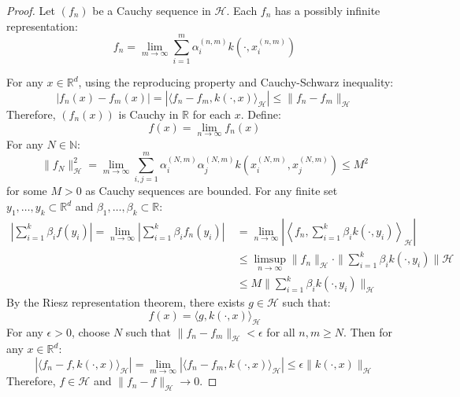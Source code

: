 \begin{proof}    

Let $(f_n)$ be a Cauchy sequence in $\mathcal{H}$. Each $f_n$ has a possibly infinite representation:
$$f_n = \lim_{m \to \infty} \sum_{i=1}^m \alpha_i^{(n,m)} k(\cdot,x_i^{(n,m)})$$

For any $x \in \mathbb{R}^d$, using the reproducing property and Cauchy-Schwarz inequality:
$$|f_n(x) - f_m(x)| = |\langle f_n - f_m, k(\cdot,x)\rangle_\mathcal{H}| \leq \|f_n - f_m\|_\mathcal{H}$$
Therefore, $(f_n(x))$ is Cauchy in $\mathbb{R}$ for each $x$. Define:
$$f(x) = \lim_{n \to \infty} f_n(x)$$
For any $N \in \mathbb{N}$:
$$\|f_N\|_\mathcal{H}^2 = \lim_{m \to \infty} \sum_{i,j=1}^m \alpha_i^{(N,m)} \alpha_j^{(N,m)} k(x_i^{(N,m)},x_j^{(N,m)}) \leq M^2$$
for some $M > 0$ as Cauchy sequences are bounded.
For any finite set ${y_1,\ldots,y_k} \subset \mathbb{R}^d$ and ${\beta_1,\ldots,\beta_k} \subset \mathbb{R}$:
\begin{align*}
\left|\sum_{i=1}^k \beta_i f(y_i)\right| = \lim_{n \to \infty} \left|\sum_{i=1}^k \beta_i f_n(y_i)\right| \
&= \lim_{n \to \infty} \left|\left\langle f_n, \sum_{i=1}^k \beta_i k(\cdot,y_i)\right\rangle_{\mathcal{H}}\right| \\
&\leq \limsup_{n \to \infty} \|f_n\|_{\mathcal{H}}\cdot \|\sum_{i=1}^k \beta_i k(\cdot,y_i)\|{\mathcal{H}} \\
&\leq M\|\sum_{i=1}^k \beta_i k(\cdot,y_i)\|_{\mathcal{H}}
\end{align*}
By the Riesz representation theorem, there exists $g \in \mathcal{H}$ such that:
$$f(x) = \langle g, k(\cdot,x)\rangle_\mathcal{H}$$
For any $\epsilon > 0$, choose $N$ such that $\|f_n - f_m\|_\mathcal{H} < \epsilon$ for all $n,m \geq N$. Then for any $x \in \mathbb{R}^d$:
$$|\langle f_n - f, k(\cdot,x)\rangle_\mathcal{H}| = \lim_{m \to \infty} |\langle f_n - f_m, k(\cdot,x)\rangle_\mathcal{H}| \leq \epsilon \|k(\cdot,x)\|_\mathcal{H}$$
Therefore, $f \in \mathcal{H}$ and $\|f_n - f\|_\mathcal{H} \to 0$. 

\end{proof}



